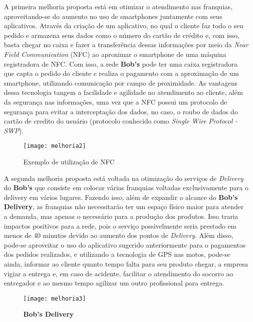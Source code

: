 		A primeira melhoria proposta está em otimizar o atendimento nas franquias, aproveitando-se do aumento no uso de smartphones juntamente com seus aplicativos. Através da criação de um aplicativo, no qual o cliente faz todo o seu pedido e armazena seus dados como o número do cartão de crédito e, com isso, basta chegar no caixa e fazer a transferência dessas informações por meio da \emph{Near Field Communication} (NFC) ao aproximar o smartphone de uma máquina registradora de NFC. Com isso, a rede \textbf{Bob's} pode ter uma caixa registradora que capta o pedido do cliente e realiza o pagamento com a aproximação de um smartphone, utilizando comunicação por campo de proximidade. As vantagens dessa tecnologia tangem a facilidade e agilidade no atendimento ao cliente, além da segurança nas informações, uma vez que a NFC possui um protocolo de segurança para evitar a interceptação dos dados, no caso, o roubo de dados do cartão de credito do usuário (protocolo conhecido como \emph{Single Wire Protocol - SWP}).

		\begin{figure}[h]
			\centering
			\texttt{[image: melhoria2]}
			\caption[Exemplo de utilização de NFC]{Exemplo de utilização de NFC}
			\label{fig:melhoria2}
		\end{figure}

		A segunda melhoria proposta está voltada na otimização do serviços de \emph{Delivery} do \textbf{Bob's} que consiste em colocar várias franquias voltadas exclusivamente para o delivery em vários lugares. Fazendo isso, além de expandir o alcance do \textbf{Bob's Delivery}, as franquias não necessitarão ter um espaço físico maior para atender a demanda, mas apenas o necessário para a produção dos produtos. Isso traria impactos positivos para a rede, pois o serviço possivelmente seria prestado em menos de 40 minutos devido ao aumento dos pontos de \emph{Delivery}. Além disso, pode-se aproveitar o uso do aplicativo sugerido anteriormente para o pagamentos dos pedidos realizados, e utilizando a tecnologia de GPS nas motos, pode-se ainda, informar ao cliente quanto tempo falta para seu produto chegar, a empresa vigiar a entrega e, em caso de acidente, facilitar o atendimento do socorro ao entregador e ao mesmo tempo agilizar um outro profissional para entrega. 

		\begin{figure}[h]
			\centering
			\texttt{[image: melhoria3]}
			\caption[Bob's Delivery]{\textbf{Bob's Delivery}}
			\label{fig:melhoria3}
		\end{figure}